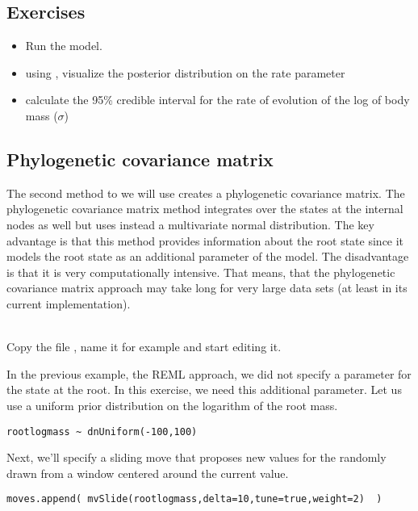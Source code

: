\subsection*{Exercises}

\begin{itemize}
\item
Run the model.
\item
using , visualize the posterior distribution on the rate parameter 
\item
calculate the 95\% credible interval for the rate of evolution of the log of body mass ($\sigma$)
\end{itemize}


\vspace{5cm}






\subsection{Phylogenetic covariance matrix}

The second method to we will use creates a phylogenetic covariance matrix. The phylogenetic covariance matrix method integrates over the states  at the internal nodes as well but uses instead a multivariate normal distribution.
The key advantage is that this method provides information about the root state since it models the root state as an additional parameter of the model. The disadvantage is that it is very computationally intensive. That means, that the phylogenetic covariance matrix approach may take long for very large data sets (at least in its current implementation).

\noindent \\ \impmark Copy the file , name it for example  and start editing it.

In the previous example, the REML approach, we did not specify a parameter for the state at the root.
In this exercise, we need this additional parameter.
Let us use a uniform prior distribution on the logarithm of the root mass.
{\tt \small \begin{snugshade*}
\begin{lstlisting}
rootlogmass ~ dnUniform(-100,100)
\end{lstlisting}
\end{snugshade*}}
Next, we'll specify a sliding move that proposes new values for the  randomly drawn from a window centered around the current value.
{\tt \small \begin{snugshade*}
\begin{lstlisting}
moves.append( mvSlide(rootlogmass,delta=10,tune=true,weight=2)  )
\end{lstlisting}
\end{snugshade*}}

